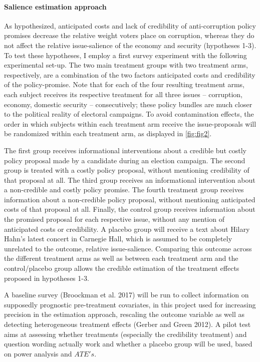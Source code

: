 \documentclass[11pt]{article}
\begin{document}
\paragraph{Salience estimation approach}
As hypothesized, anticipated costs and lack of credibility of anti-corruption policy promises decrease the relative weight voters place on corruption, whereas they do not affect the relative issue-salience of the economy and security (hypotheses 1-3). To test these hypotheses, I employ a first survey experiment with the following experimental set-up. The two main treatment groups with two treatment arms, respectively, are a combination of the two factors anticipated costs and credibility of the policy-promise. Note that for each of the four resulting treatment arms, each subject receives its respective treatment for all three issues -- corruption, economy, domestic security -- consecutively; these policy bundles are much closer to the political reality of electoral campaigns. To avoid contamination effects, the order in which subjects within each treatment arm receive the issue-proposals will be randomized within each treatment arm, as displayed in \autoref{fig:fig2}.

The first group receives informational interventions about a credible but costly policy proposal made by a candidate during an election campaign. The second group is treated with a costly policy proposal, without mentioning credibility of that proposal at all. The third group receives an informational intervention about a non-credible and costly policy promise. The fourth treatment group receives information about a non-credible policy proposal, without mentioning anticipated costs of that proposal at all. Finally, the control group receives information about the promised proposal for each respective issue, without any mention of anticipated costs or credibility. A placebo group will receive a text about Hilary Hahn's latest concert in Carnegie Hall, which is assumed to be completely unrelated to the outcome, relative issue-salience. Comparing this outcome across the different treatment arms as well as between each treatment arm and the control/placebo group allows the credible estimation of the treatment effects proposed in hypotheses 1-3.

A baseline survey (Broockman et al. 2017) will be run to collect information on supposedly prognostic pre-treatment covariates, in this project used for increasing precision in the estimation approach, rescaling the outcome variable as well as detecting heterogeneous treatment effects (Gerber and Green 2012). A pilot test aims at assessing whether treatments (especially the credibility treatment) and question wording actually work and whether a placebo group will be used, based on power analysis and $ATE's$.
\end{document}
